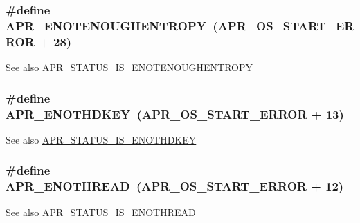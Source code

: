 \subsubsection[{\texorpdfstring{A\+P\+R\+\_\+\+E\+N\+O\+T\+E\+N\+O\+U\+G\+H\+E\+N\+T\+R\+O\+PY}{APR_ENOTENOUGHENTROPY}}]{\setlength{\rightskip}{0pt plus 5cm}\#define A\+P\+R\+\_\+\+E\+N\+O\+T\+E\+N\+O\+U\+G\+H\+E\+N\+T\+R\+O\+PY~({\bf A\+P\+R\+\_\+\+O\+S\+\_\+\+S\+T\+A\+R\+T\+\_\+\+E\+R\+R\+OR} + 28)}\hypertarget{group___a_p_r___error_gaaee9e4e763844197e3750bb66ff75cd0}{}\label{group___a_p_r___error_gaaee9e4e763844197e3750bb66ff75cd0}
\begin{DoxySeeAlso}{See also}
\hyperlink{group___a_p_r___s_t_a_t_u_s___i_s_gab8b0af2df80bfb9edfc8dbcbb6bdf925}{A\+P\+R\+\_\+\+S\+T\+A\+T\+U\+S\+\_\+\+I\+S\+\_\+\+E\+N\+O\+T\+E\+N\+O\+U\+G\+H\+E\+N\+T\+R\+O\+PY} 
\end{DoxySeeAlso}
\subsubsection[{\texorpdfstring{A\+P\+R\+\_\+\+E\+N\+O\+T\+H\+D\+K\+EY}{APR_ENOTHDKEY}}]{\setlength{\rightskip}{0pt plus 5cm}\#define A\+P\+R\+\_\+\+E\+N\+O\+T\+H\+D\+K\+EY~({\bf A\+P\+R\+\_\+\+O\+S\+\_\+\+S\+T\+A\+R\+T\+\_\+\+E\+R\+R\+OR} + 13)}\hypertarget{group___a_p_r___error_ga29faf801fac647a14360e7493f7fd74e}{}\label{group___a_p_r___error_ga29faf801fac647a14360e7493f7fd74e}
\begin{DoxySeeAlso}{See also}
\hyperlink{group___a_p_r___s_t_a_t_u_s___i_s_ga929b07c77d776fdc9a64ac238c3f5e5c}{A\+P\+R\+\_\+\+S\+T\+A\+T\+U\+S\+\_\+\+I\+S\+\_\+\+E\+N\+O\+T\+H\+D\+K\+EY} 
\end{DoxySeeAlso}
\subsubsection[{\texorpdfstring{A\+P\+R\+\_\+\+E\+N\+O\+T\+H\+R\+E\+AD}{APR_ENOTHREAD}}]{\setlength{\rightskip}{0pt plus 5cm}\#define A\+P\+R\+\_\+\+E\+N\+O\+T\+H\+R\+E\+AD~({\bf A\+P\+R\+\_\+\+O\+S\+\_\+\+S\+T\+A\+R\+T\+\_\+\+E\+R\+R\+OR} + 12)}\hypertarget{group___a_p_r___error_ga7b43e1e075ff031e142aa809295ee441}{}\label{group___a_p_r___error_ga7b43e1e075ff031e142aa809295ee441}
\begin{DoxySeeAlso}{See also}
\hyperlink{group___a_p_r___s_t_a_t_u_s___i_s_ga5f187edda23f3d1cc9d3bddd5f7759d3}{A\+P\+R\+\_\+\+S\+T\+A\+T\+U\+S\+\_\+\+I\+S\+\_\+\+E\+N\+O\+T\+H\+R\+E\+AD} 
\end{DoxySeeAlso}

